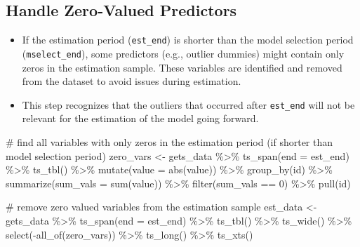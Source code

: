 \documentclass[
  letterpaper,
  DIV=11,
  numbers=noendperiod]{scrreport}
\newenvironment{Shaded}{\begin{snugshade}}{\end{snugshade}}
\newcommand{\AttributeTok}[1]{\textcolor[rgb]{0.40,0.45,0.13}{#1}}
\newcommand{\CommentTok}[1]{\textcolor[rgb]{0.37,0.37,0.37}{#1}}
\newcommand{\DecValTok}[1]{\textcolor[rgb]{0.68,0.00,0.00}{#1}}
\newcommand{\FunctionTok}[1]{\textcolor[rgb]{0.28,0.35,0.67}{#1}}
\newcommand{\NormalTok}[1]{\textcolor[rgb]{0.00,0.23,0.31}{#1}}
\newcommand{\OtherTok}[1]{\textcolor[rgb]{0.00,0.23,0.31}{#1}}
\newcommand{\SpecialCharTok}[1]{\textcolor[rgb]{0.37,0.37,0.37}{#1}}
\providecommand{\tightlist}{%
  \setlength{\itemsep}{0pt}\setlength{\parskip}{0pt}}\usepackage{longtable,booktabs,array}
\begin{document}
\subsection{Handle Zero-Valued
Predictors}\label{handle-zero-valued-predictors}

\begin{itemize}
\tightlist
\item
  If the estimation period (\texttt{est\_end}) is shorter than the model
  selection period (\texttt{mselect\_end}), some predictors (e.g.,
  outlier dummies) might contain only zeros in the estimation sample.
  These variables are identified and removed from the dataset to avoid
  issues during estimation.\\
\item
  This step recognizes that the outliers that occurred after
  \texttt{est\_end} will not be relevant for the estimation of the model
  going forward.
\end{itemize}

\begin{Shaded}
\begin{Highlighting}[]
\CommentTok{\# find all variables with only zeros in the estimation period (if shorter than model selection period)}
\NormalTok{zero\_vars }\OtherTok{\textless{}{-}}\NormalTok{ gets\_data }\SpecialCharTok{\%\textgreater{}\%}
  \FunctionTok{ts\_span}\NormalTok{(}\AttributeTok{end =}\NormalTok{ est\_end) }\SpecialCharTok{\%\textgreater{}\%}
  \FunctionTok{ts\_tbl}\NormalTok{() }\SpecialCharTok{\%\textgreater{}\%}
  \FunctionTok{mutate}\NormalTok{(}\AttributeTok{value =} \FunctionTok{abs}\NormalTok{(value)) }\SpecialCharTok{\%\textgreater{}\%}
  \FunctionTok{group\_by}\NormalTok{(id) }\SpecialCharTok{\%\textgreater{}\%}
  \FunctionTok{summarize}\NormalTok{(}\AttributeTok{sum\_vals =} \FunctionTok{sum}\NormalTok{(value)) }\SpecialCharTok{\%\textgreater{}\%}
  \FunctionTok{filter}\NormalTok{(sum\_vals }\SpecialCharTok{==} \DecValTok{0}\NormalTok{) }\SpecialCharTok{\%\textgreater{}\%}
  \FunctionTok{pull}\NormalTok{(id)}

\CommentTok{\# remove zero valued variables from the estimation sample}
\NormalTok{est\_data }\OtherTok{\textless{}{-}}\NormalTok{ gets\_data }\SpecialCharTok{\%\textgreater{}\%}
  \FunctionTok{ts\_span}\NormalTok{(}\AttributeTok{end =}\NormalTok{ est\_end) }\SpecialCharTok{\%\textgreater{}\%}
  \FunctionTok{ts\_tbl}\NormalTok{() }\SpecialCharTok{\%\textgreater{}\%}
  \FunctionTok{ts\_wide}\NormalTok{() }\SpecialCharTok{\%\textgreater{}\%}
  \FunctionTok{select}\NormalTok{(}\SpecialCharTok{{-}}\FunctionTok{all\_of}\NormalTok{(zero\_vars)) }\SpecialCharTok{\%\textgreater{}\%}
  \FunctionTok{ts\_long}\NormalTok{() }\SpecialCharTok{\%\textgreater{}\%}
  \FunctionTok{ts\_xts}\NormalTok{()}
\end{Highlighting}
\end{Shaded}
\end{document}
